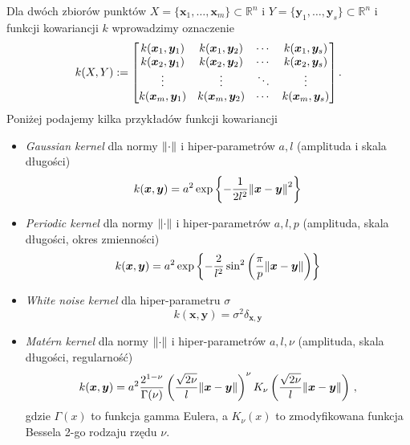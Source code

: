 \documentclass{myclass}
\numberwithin{equation}{subsection}
\begin{document}
Dla dwóch zbiorów punktów \(X = \{\bm{x}_1,\ldots,\bm{x}_m\} \subset \mathbb{R}^n\) i \(Y =
\{\bm{y}_1,\ldots,\bm{y}_s\} \subset \mathbb{R}^n\) i funkcji kowariancji \(k\) wprowadzimy
oznaczenie
\begin{equation}
    k(X,Y) := \mqty[k(\bm{x}_1, \bm{y}_1) & k(\bm{x}_1, \bm{y}_2) & \cdots & k(\bm{x}_1, \bm{y}_s)\\
    k(\bm{x}_2, \bm{y}_1) & k(\bm{x}_2, \bm{y}_2) & \cdots & k(\bm{x}_2, \bm{y}_s)\\
    \vdots & \vdots & \ddots & \vdots\\
    k(\bm{x}_m, \bm{y}_1) & k(\bm{x}_m, \bm{y}_2) & \cdots & k(\bm{x}_m, \bm{y}_s)\\]\,.
\end{equation}
Poniżej podajemy kilka przykładów funkcji kowariancji
\begin{itemize}
    \item \textit{Gaussian kernel} dla normy \(\norm{\cdot}\) i hiper-parametrów \(a,l\) (amplituda
    i skala długości)
    \begin{equation}
        k(\bm{x}, \bm{y}) = a^2\exp\left\{-\frac{1}{2l^2}\norm{\bm{x} - \bm{y}}^2\right\}
    \end{equation}
    
    \item \textit{Periodic kernel} dla normy \(\norm{\cdot}\) i hiper-parametrów \(a, l, p\)
    (amplituda, skala długości, okres zmienności)
    \begin{equation}
        k(\bm{x},\bm{y}) = a^2\exp\left\{-\frac{2}{l^2}\sin^2\left(\frac{\pi}{p}\norm{\bm{x} - \bm{y}}\right)\right\}
    \end{equation}

    \item \textit{White noise kernel} dla hiper-parametru \(\sigma\)
    \begin{equation}
        k(\bm{x},\bm{y}) = \sigma^2 \delta_{\bm{x},\bm{y}}
    \end{equation}

    \item \textit{Mat\'ern kernel} dla normy \(\norm{\cdot}\) i hiper-parametrów \(a, l, \nu\)
    (amplituda, skala długości, regularność)
    \begin{equation}
        k(\bm{x},\bm{y}) = a^2 \frac{2^{1-\nu}}{\Gamma(\nu)}\left(\frac{\sqrt{2\nu}}{l}\norm{\bm{x} - \bm{y}}\right)^\nu K_\nu\left(\frac{\sqrt{2\nu}}{l}\norm{\bm{x} - \bm{y}}\right)\,,
    \end{equation}
    gdzie \(\Gamma(x)\) to funkcja gamma Eulera, a \(K_\nu(x)\) to zmodyfikowana funkcja Bessela
    2-go rodzaju rzędu \(\nu\).

\end{itemize}
\end{document}
